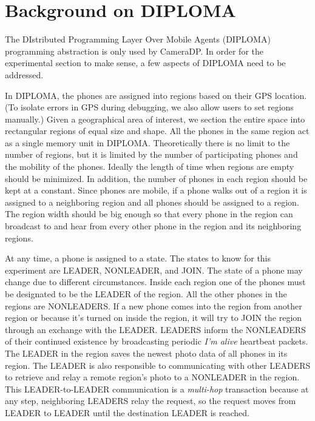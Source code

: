 \chapter{Background on DIPLOMA}

The DIstributed Programming Layer Over Mobile Agents (DIPLOMA) \cite{diploma} programming abstraction is only used by CameraDP. In order for the experimental section to make sense, a few aspects of DIPLOMA need to be addressed. 

In DIPLOMA, the phones are assigned into regions \cite{virtualnode} based on their GPS location. (To isolate errors in GPS during debugging, we also allow users to set regions manually.) Given a geographical area of interest, we section the entire space into rectangular regions of equal size and shape. All the phones in the same region act as a single memory unit in DIPLOMA. Theoretically there is no limit to the number of regions, but it is limited by the number of participating phones and the mobility of the phones. Ideally the length of time when regions are empty should be minimized. In addition, the number of phones in each region should be kept at a constant. Since phones are mobile, if a phone walks out of a region it is assigned to a neighboring region and all phones should be assigned to a region. The region width should be big enough so that every phone in the region can broadcast to and hear from every other phone in the region and its neighboring regions.

At any time, a phone is assigned to a state. The states to know for this experiment are LEADER, NONLEADER, and JOIN. The state of a phone may change due to different circumstances. Inside each region one of the phones must be designated to be the LEADER of the region. All the other phones in the regions are NONLEADERS. If a new phone comes into the region from another region or because it's turned on inside the region, it will try to JOIN the region through an exchange with the LEADER. LEADERS inform the NONLEADERS of their continued existence by broadcasting periodic {\it I'm alive} heartbeat packets. The LEADER in the region saves the newest photo data of all phones in its region. The LEADER is also responsible to communicating with other LEADERS to retrieve and relay a remote region's photo to a NONLEADER in the region. This LEADER-to-LEADER communication is a {\it multi-hop} transaction because at any step, neighboring LEADERS relay the request, so the request moves from LEADER to LEADER until the destination LEADER is reached.

